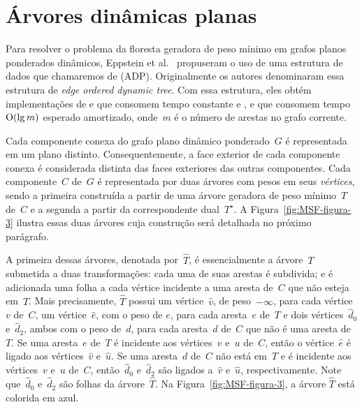\section{Árvores dinâmicas planas}
\label{sec:MSFcomADP}

Para resolver o problema da floresta geradora de peso mínimo em grafos planos ponderados dinâmicos, Eppstein et al.~\cite{EPPSTEIN-planar} propuseram o uso de uma estrutura de dados que chamaremos de  (ADP). Originalmente os autores denominaram essa estrutura de \textit{edge ordered dynamic tree}.
Com essa estrutura, eles obtém implementações de \MSFCreate{} e \MSFweight{} que consomem tempo constante e \MSFaddEdge{}, \MSFdelEdge{} e \MSFupdate{} que consomem tempo~$\mathrm{O}(\lg m)$ esperado amortizado, onde~$m$ é o número de arestas no grafo corrente. 



Cada componente conexa do grafo plano dinâmico ponderado~$G$ é representada em um plano distinto.
Consequentemente, a face exterior de cada componente conexa é considerada distinta das faces exteriores das outras componentes.
Cada componente~$C$ de~$G$ é representada por duas árvores com pesos em seus \textit{vértices}, sendo a primeira construída a partir de uma árvore geradora de peso mínimo~$T$ de~$C$ e a segunda a partir da correspondente dual~$T^\star$.
A Figura~\ref{fig:MSF-figura-3} ilustra essas duas árvores cuja construção será detalhada no próximo parágrafo.

A primeira dessas árvores, denotada por~$\hat T$, é essencialmente a árvore~$T$ submetida a duas transformações:
cada uma de suas arestas é subdivida; e é adicionada uma folha a cada vértice incidente a uma aresta de~$C$ que não esteja em~$T$.
Mais precisamente, $\hat T$ possui um vértice~$\hat v$, de peso~$-\infty$, para cada vértice~$v$ de~$C$, um vértice~$\hat e$, com o peso de $e$, para cada aresta~$e$ de~$T$ e dois vértices~$\hat d_0$ e~$\hat d_2$, ambos com o peso de~$d$, para cada aresta~$d$ de~$C$ que não é uma aresta de~$T$.
Se uma aresta~$e$ de~$T$ é incidente aos vértices~$v$ e~$u$ de~$C$, então o vértice~$\hat e$ é ligado aos vértices~$\hat v$ e~$\hat u$.
Se uma aresta~$d$ de~$C$ não está em~$T$ e é incidente aos vértices~$v$ e~$u$ de~$C$, então~$\hat d_0$ e~$\hat d_2$ são ligados a~$\hat v$ e~$\hat u$, respectivamente.
Note que~$\hat d_0$ e~$\hat d_2$ são folhas da árvore~$\hat T$.
Na Figura~\ref{fig:MSF-figura-3}, a árvore $\hat T$ está colorida em azul.


